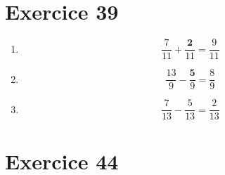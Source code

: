 \documentclass[12pt,a4paper]{article}
\begin{document}
%
%
%		
%		
%		
%		
%		
%	
%	

\section*{Exercice 39}

\begin{multicols}{3}
	\begin{enumerate}
		\item \begin{equation*}
		\dfrac{7}{11} + \dfrac{\mathbf{2}}{11} = \dfrac{9}{11}
		\end{equation*}
		
		
		\item \begin{equation*}
		\dfrac{13}{9} - \dfrac{\mathbf{5}}{9} = \dfrac{8}{9}
		\end{equation*}
		
		
		\item \begin{equation*}
		\dfrac{7}{13} - \dfrac{5}{13} = \dfrac{2}{13} 
		\end{equation*}
		
	\end{enumerate}
	
	
\end{multicols}

\newpage
\section*{Exercice 44}
\end{document}
